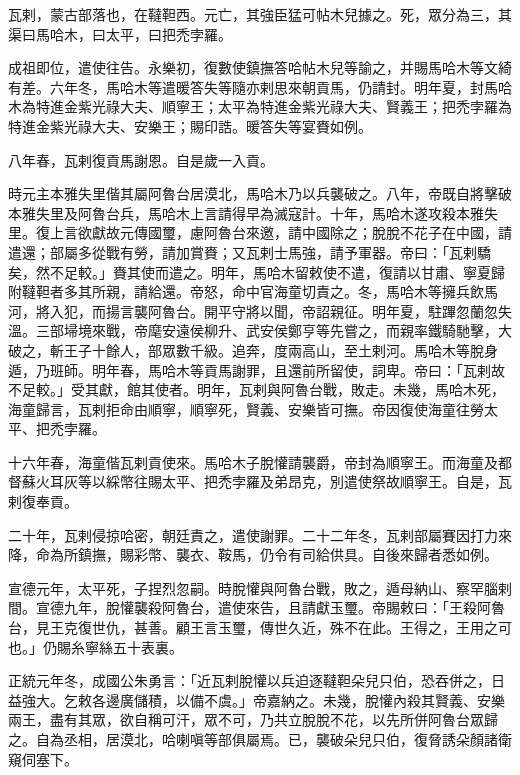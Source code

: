 
\begin{pinyinscope}
瓦剌，蒙古部落也，在韃靼西。元亡，其強臣猛可帖木兒據之。死，眾分為三，其渠曰馬哈木，曰太平，曰把禿孛羅。

成祖即位，遣使往告。永樂初，復數使鎮撫答哈帖木兒等諭之，并賜馬哈木等文綺有差。六年冬，馬哈木等遣暖答失等隨亦剌思來朝貢馬，仍請封。明年夏，封馬哈木為特進金紫光祿大夫、順寧王；太平為特進金紫光祿大夫、賢義王；把禿孛羅為特進金紫光祿大夫、安樂王；賜印誥。暖答失等宴賚如例。

八年春，瓦剌復貢馬謝恩。自是歲一入貢。

時元主本雅失里偕其屬阿魯台居漠北，馬哈木乃以兵襲破之。八年，帝既自將擊破本雅失里及阿魯台兵，馬哈木上言請得早為滅寇計。十年，馬哈木遂攻殺本雅失里。復上言欲獻故元傳國璽，慮阿魯台來邀，請中國除之；脫脫不花子在中國，請遣還；部屬多從戰有勞，請加賞賚；又瓦剌士馬強，請予軍器。帝曰：「瓦剌驕矣，然不足較。」賚其使而遣之。明年，馬哈木留敕使不遣，復請以甘肅、寧夏歸附韃靼者多其所親，請給還。帝怒，命中官海童切責之。冬，馬哈木等擁兵飲馬河，將入犯，而揚言襲阿魯台。開平守將以聞，帝詔親征。明年夏，駐蹕忽蘭忽失溫。三部埽境來戰，帝麾安遠侯柳升、武安侯鄭亨等先嘗之，而親率鐵騎馳擊，大破之，斬王子十餘人，部眾數千級。追奔，度兩高山，至土剌河。馬哈木等脫身遁，乃班師。明年春，馬哈木等貢馬謝罪，且還前所留使，詞卑。帝曰：「瓦剌故不足較。」受其獻，館其使者。明年，瓦剌與阿魯台戰，敗走。未幾，馬哈木死，海童歸言，瓦剌拒命由順寧，順寧死，賢義、安樂皆可撫。帝因復使海童往勞太平、把禿孛羅。

十六年春，海童偕瓦剌貢使來。馬哈木子脫懽請襲爵，帝封為順寧王。而海童及都督蘇火耳灰等以綵幣往賜太平、把禿孛羅及弟昂克，別遣使祭故順寧王。自是，瓦剌復奉貢。

二十年，瓦剌侵掠哈密，朝廷責之，遣使謝罪。二十二年冬，瓦剌部屬賽因打力來降，命為所鎮撫，賜彩幣、襲衣、鞍馬，仍令有司給供具。自後來歸者悉如例。

宣德元年，太平死，子捏烈忽嗣。時脫懽與阿魯台戰，敗之，遁母納山、察罕腦剌間。宣德九年，脫懽襲殺阿魯台，遣使來告，且請獻玉璽。帝賜敕曰：「王殺阿魯台，見王克復世仇，甚善。顧王言玉璽，傳世久近，殊不在此。王得之，王用之可也。」仍賜糸寧絲五十表裏。

正統元年冬，成國公朱勇言：「近瓦剌脫懽以兵迫逐韃靼朵兒只伯，恐吞併之，日益強大。乞敕各邊廣儲積，以備不虞。」帝嘉納之。未幾，脫懽內殺其賢義、安樂兩王，盡有其眾，欲自稱可汗，眾不可，乃共立脫脫不花，以先所併阿魯台眾歸之。自為丞相，居漠北，哈喇嗔等部俱屬焉。已，襲破朵兒只伯，復脅誘朵顏諸衛窺伺塞下。


\end{pinyinscope}
